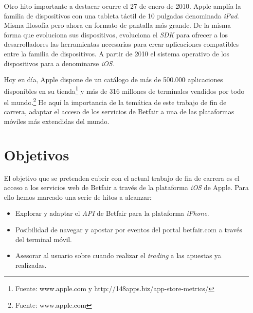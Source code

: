    Otro hito importante a destacar ocurre el 27 de enero de 2010. Apple amplía la familia de dispositivos con una tableta táctil de 10 pulgadas denominada \emph{iPad}. Misma filosofía pero ahora en formato de pantalla más grande. De la misma forma que evoluciona sus dispositivos, evoluciona el \emph{SDK} para ofrecer a los desarrolladores las herramientas necesarias para crear aplicaciones compatibles entre la familia de dispositivos. A partir de 2010 el sistema operativo de los dispositivos para a denominarse \emph{iOS}. 
    
  Hoy en día, Apple dispone de un catálogo de más de 500.000 aplicaciones disponibles en su tienda\footnote{Fuente: www.apple.com y http://148apps.biz/app-store-metrics/} y más de 316 millones de terminales vendidos por todo el mundo.\footnote{Fuente: www.apple.com} He aquí la importancia de la temática de este trabajo de fin de carrera, adaptar el acceso de los servicios de Betfair a una de las plataformas móviles más extendidas del mundo.     
   
\section{Objetivos}

 El objetivo que se pretenden cubrir con el actual trabajo de fin de carrera es el acceso a los servicios web de Betfair a través de la plataforma \emph{iOS} de Apple. Para ello hemos marcado una serie de hitos a alcanzar:
 \begin{itemize}
 	\item Explorar y adaptar el \emph{API} de Betfair para la plataforma \emph{iPhone}.
 	\item Posibilidad de navegar y apostar por eventos del portal betfair.com a través del terminal móvil.
	\item Asesorar al usuario sobre cuando realizar el \emph{trading} a las apuestas ya realizadas.
\end{itemize}

